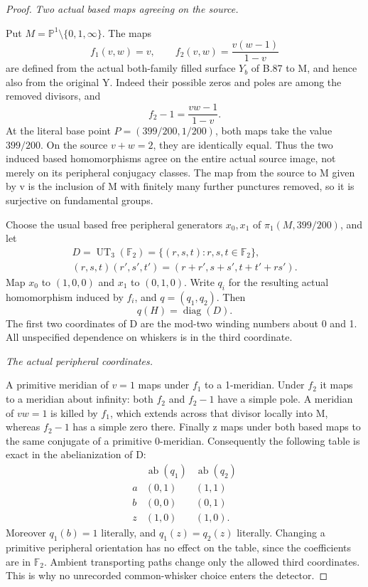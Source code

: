 \begin{proof}
\emph{Two actual based maps agreeing on the source.}\par
Put \(M=\mathbb P^1\setminus\{0,1,\infty\}\). The maps
\[
 f_1(v,w)=v,\qquad f_2(v,w)=\frac{v(w-1)}{1-v}
\tag{B.88.2}
\]
are defined from the actual both-family filled surface \(Y_b\) of
B.87 to M, and hence also from the original Y. Indeed their possible
zeros and poles are among the removed divisors, and
\[
                 f_2-1=\frac{vw-1}{1-v}.
\tag{B.88.3}
\]
At the literal base point \(P=(399/200,1/200)\), both maps take the
value \(399/200\). On the source \(v+w=2\), they are identically
equal. Thus the two induced based homomorphisms agree on the entire
actual source image, not merely on its peripheral conjugacy classes.
The map from the source to M given by v is the inclusion of M with
finitely many further punctures removed, so it is surjective on
fundamental groups.

Choose the usual based free peripheral generators \(x_0,x_1\) of
\(\pi_1(M,399/200)\), and let
\[
 \begin{gathered}
 D=\operatorname{UT}_3(\mathbb F_2)
   =\{(r,s,t):r,s,t\in\mathbb F_2\},\\
 (r,s,t)(r',s',t')=(r+r',s+s',t+t'+rs').
 \end{gathered}
\tag{B.88.4}
\]
Map \(x_0\) to \((1,0,0)\) and \(x_1\) to \((0,1,0)\).
Write \(q_i\) for the resulting actual homomorphism induced by
\(f_i\), and \(q=(q_1,q_2)\). Then
\[
                         q(H)=\operatorname{diag}(D).
\tag{B.88.5}
\]
The first two coordinates of D are the mod-two winding numbers about
0 and 1. All unspecified dependence on whiskers is in the third
coordinate.

\emph{The actual peripheral coordinates.}\par
A primitive meridian of \(v=1\) maps under \(f_1\) to a 1-meridian.
Under \(f_2\) it maps to a meridian about infinity: both \(f_2\)
and \(f_2-1\) have a simple pole. A meridian of \(vw=1\) is killed
by \(f_1\), which extends across that divisor locally into M, whereas
\(f_2-1\) has a simple zero there. Finally z maps under both based
maps to the same conjugate of a primitive 0-meridian. Consequently the
following table is exact in the abelianization of D:
\[
\begin{array}{c|cc}
 &\operatorname{ab}(q_1)&\operatorname{ab}(q_2)\\ \hline
 a&(0,1)&(1,1)\\
 b&(0,0)&(0,1)\\
 z&(1,0)&(1,0).
\end{array}
\tag{B.88.6}
\]
Moreover \(q_1(b)=1\) literally, and \(q_1(z)=q_2(z)\) literally.
Changing a primitive peripheral orientation has no effect on the table,
since the coefficients are in \(\mathbb F_2\). Ambient transporting
paths change only the allowed third coordinates. This is why no
unrecorded common-whisker choice enters the detector.


\end{proof}
